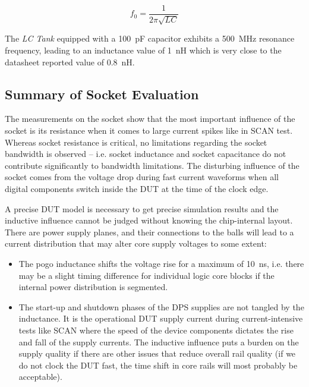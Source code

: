 \begin{equation}
    \label{eq:resonant-freq}
    f_0 = \frac{1}{2\pi\sqrt{LC}}
\end{equation}

The \emph{LC Tank} equipped with a \SI{100}{\pico\farad} capacitor
exhibits a \SI{500}{\mega\hertz} resonance frequency, leading to an inductance
value of \SI{1}{\nano\henry} which is very close to the datasheet reported
value of \SI{0.8}{\nano\henry}.


\subsection{Summary of Socket Evaluation}
\label{subsec:summary-socket-evaluation}

The measurements on the socket show that the most important influence of
the socket is its resistance when it comes to large current spikes like
in SCAN test.
Whereas socket resistance is critical, no limitations regarding the
socket bandwidth is observed – i.e. socket inductance and socket capacitance do
not contribute significantly to bandwidth limitations.
The disturbing influence of the socket comes from the voltage drop during
fast current waveforms when all digital components switch inside the DUT
at the time of the clock edge.

A precise DUT model is necessary to get precise simulation results and the
inductive influence cannot be judged without knowing the chip-internal layout.
There are power supply planes, and their connections to the balls will lead to
a current distribution that may alter core supply voltages to some extent:

\begin{itemize}[topsep=8pt,itemsep=4pt,partopsep=4pt, parsep=4pt]

    \item
    The pogo inductance shifts the voltage rise for a maximum
    of \SI{10}{\nano\second}, i.e. there may be a slight timing difference for
    individual logic core blocks if the internal power distribution
    is segmented.

    \item
    The start-up and shutdown phases of the DPS supplies are not tangled by the
    inductance.
    It is the operational DUT supply current during current-intensive tests
    like SCAN where the speed of the device components dictates the rise and
    fall of the supply currents. The inductive influence puts a burden
    on the supply quality if there are other issues that reduce overall
    rail quality (if we do not clock the DUT fast, the time shift in core rails
    will most probably be acceptable).

\end{itemize}

